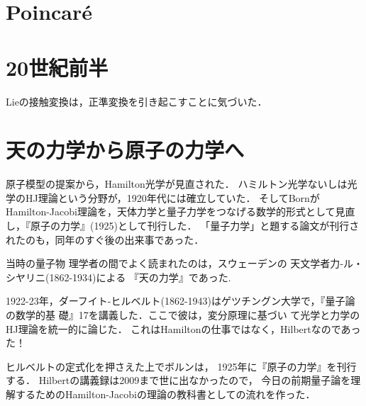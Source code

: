 \documentclass[uplatex,dvipdfmx]{jsreport}
\begin{document}
\section{Poincaré}

\section{20世紀前半}

\begin{history}
    Lieの接触変換は，正準変換を引き起こすことに気づいた．
\end{history}

\section{天の力学から原子の力学へ}

\begin{tcolorbox}[colframe=ForestGreen, colback=ForestGreen!10!white,breakable,colbacktitle=ForestGreen!40!white,coltitle=black,fonttitle=\bfseries\sffamily,
title=]
    原子模型の提案から，Hamilton光学が見直された．
    ハミルトン光学ないしは光学のHJ理論という分野が，1920年代には確立していた．
    そしてBornがHamilton-Jacobi理論を，天体力学と量子力学をつなげる数学的形式として見直し，『原子の力学』(1925)として刊行した．
    「量子力学」と題する論文が刊行されたのも，同年のすぐ後の出来事であった．
\end{tcolorbox}

\begin{history}
    当時の量子物
理学者の間でよく読まれたのは，スウェーデンの
天文学者力‐ル・シヤリニ(1862-1934)による
『天の力学』であった.
\end{history}

\begin{history}
    1922-23年，ダーフイト-ヒルベルト(1862-1943)はゲツチングン大学で，『量子論の数学的基
    礎』17を講義した．ここで彼は，変分原理に基づい
    て光学と力学のHJ理論を統一的に論じた．
    これはHamiltonの仕事ではなく，Hilbertなのであった！
\end{history}

\begin{history}
    ヒルベルトの定式化を押さえた上でボルンは，
    1925年に『原子の力学』を刊行する．
    Hilbertの講義録は2009まで世に出なかったので，
    今日の前期量子論を理解するためのHamilton-Jacobiの理論の教科書としての流れを作った．
\end{history}
\end{document}

